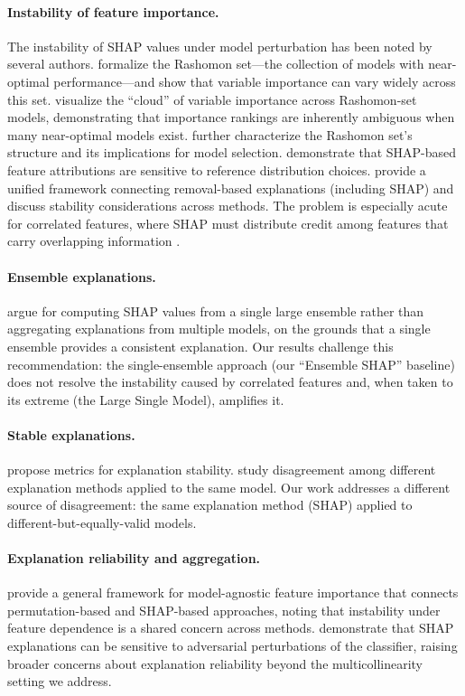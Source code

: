 \documentclass[11pt]{article}
\begin{document}
\paragraph{Instability of feature importance.}
The instability of SHAP values under model perturbation has been noted by
several authors. \citet{fisher2019all} formalize the Rashomon set---the
collection of models with near-optimal performance---and show that
variable importance can vary widely across this set.
\citet{dong2020exploring} visualize the ``cloud'' of variable importance
across Rashomon-set models, demonstrating that importance rankings are
inherently ambiguous when many near-optimal models exist.
\citet{semenova2022existence} further characterize the Rashomon set's
structure and its implications for model selection.
\citet{marx2023but} demonstrate that SHAP-based feature attributions
are sensitive to reference distribution choices.
\citet{covert2021explaining} provide a unified framework connecting
removal-based explanations (including SHAP) and discuss stability
considerations across methods.
The problem is especially acute for correlated features, where SHAP must
distribute credit among features that carry overlapping information
\citep{kumar2020problems, chen2020true}.

\paragraph{Ensemble explanations.}
\citet{paillard2025ensemble} argue for computing SHAP values from a single
large ensemble rather than aggregating explanations from multiple models,
on the grounds that a single ensemble provides a consistent explanation.
Our results challenge this recommendation: the single-ensemble approach
(our ``Ensemble SHAP'' baseline) does not resolve the instability caused
by correlated features and, when taken to its extreme (the Large Single
Model), amplifies it.

\paragraph{Stable explanations.}
\citet{alvarez2018towards} propose metrics for explanation stability.
\citet{krishna2022disagreement} study disagreement among different
explanation methods applied to the same model. Our work addresses a
different source of disagreement: the same explanation method (SHAP)
applied to different-but-equally-valid models.

\paragraph{Explanation reliability and aggregation.}
\citet{molnar2022general} provide a general framework for model-agnostic
feature importance that connects permutation-based and SHAP-based
approaches, noting that instability under feature dependence is a shared
concern across methods. \citet{slack2020fooling} demonstrate that
SHAP explanations can be sensitive to adversarial perturbations of the
classifier, raising broader concerns about explanation reliability
beyond the multicollinearity setting we address.
\end{document}
